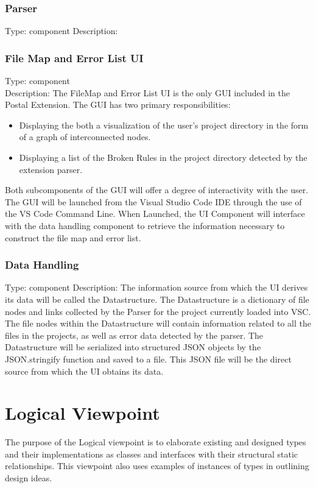 \documentclass[letterpaper,10pt,titlepage,draftclsnofoot,onecolumn,onesided] {IEEEtran}
\begin{document}
	\subsubsection{Parser}
	Type: component
	Description:
		
	
	\subsubsection{File Map and Error List UI}
	Type: component
	\\
	Description: The FileMap and Error List UI is the only GUI included in the Postal Extension. 
	The GUI has two primary responsibilities: 
	\begin{itemize}
	\item Displaying the both a visualization of the user's project directory in the form of a graph of interconnected nodes.
	\item Displaying a list of the Broken Rules in the project directory detected by the extension parser.
	\end{itemize}
	Both subcomponents of the GUI will offer a degree of interactivity with the user. 
	The GUI will be launched from the Visual Studio Code IDE through the use of the VS Code Command Line.
	When Launched, the UI Component will interface with the data handling component to retrieve the information necessary to construct the file map and error list.

	
	\subsubsection{Data Handling} 
	Type: component
	Description: The information source from which the UI derives its data will be called the Datastructure. 
	The Datastructure is a dictionary of file nodes and links collected by the Parser for the project currently loaded into VSC. 
	The file nodes within the Datastructure will contain information related to all the files in the projects, as well as error data detected by the parser.
	The Datastructure will be serialized into structured JSON objects by the JSON.stringify function and saved to a file. 
	This JSON file will be the direct source from which the UI obtains its data.

	
	
\section{Logical Viewpoint}
The purpose of the Logical viewpoint is to elaborate existing and designed types and their implementations
as classes and interfaces with their structural static relationships. This viewpoint also uses examples of
instances of types in outlining design ideas. 
\end{document}
